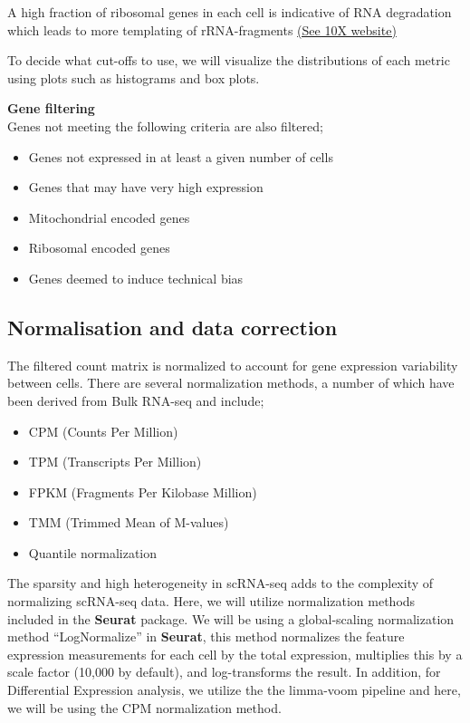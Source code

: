 \documentclass[
]{book}
\providecommand{\tightlist}{%
  \setlength{\itemsep}{0pt}\setlength{\parskip}{0pt}}
\begin{document}
A high fraction of ribosomal genes in each cell is indicative of RNA degradation which leads to more templating of rRNA-fragments \href{https://kb.10xgenomics.com/hc/en-us/articles/218169723-What-fraction-of-reads-map-to-ribosomal-proteins-}{(See 10X website)}

To decide what cut-offs to use, we will visualize the distributions of each metric using plots such as histograms and box plots.

\textbf{Gene filtering}\\

Genes not meeting the following criteria are also filtered;

\begin{itemize}
\tightlist
\item
  Genes not expressed in at least a given number of cells
\item
  Genes that may have very high expression
\item
  Mitochondrial encoded genes
\item
  Ribosomal encoded genes
\item
  Genes deemed to induce technical bias
\end{itemize}

\hypertarget{normalisation-and-data-correction}{%
\subsection{Normalisation and data correction}\label{normalisation-and-data-correction}}

The filtered count matrix is normalized to account for gene expression variability between cells. There are several normalization methods, a number of which have been derived from Bulk RNA-seq and include;

\begin{itemize}
\tightlist
\item
  CPM (Counts Per Million)
\item
  TPM (Transcripts Per Million)
\item
  FPKM (Fragments Per Kilobase Million)
\item
  TMM (Trimmed Mean of M-values)
\item
  Quantile normalization
\end{itemize}

The sparsity and high heterogeneity in scRNA-seq adds to the complexity of normalizing scRNA-seq data. Here, we will utilize normalization methods included in the \textbf{Seurat} package. We will be using a global-scaling normalization method ``LogNormalize'' in \textbf{Seurat}, this method normalizes the feature expression measurements for each cell by the total expression, multiplies this by a scale factor (10,000 by default), and log-transforms the result. In addition, for Differential Expression analysis, we utilize the the limma-voom pipeline \citep[law2014voom]{ritchie2015limma} and here, we will be using the CPM normalization method.
\end{document}

